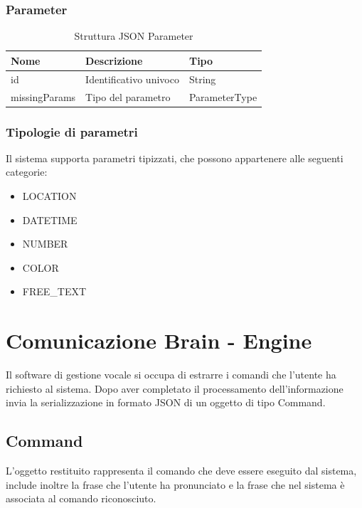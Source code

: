 \documentclass[twoside]{supsistudent}
\begin{document}
\subsection{Parameter}
\begin{table}[H]
\centering
\caption{Struttura JSON Parameter}
\label{Struttura JSON Parameter}
\begin{tabular}{@{}|l|l|l|@{}}
\toprule
Nome & Descrizione            & Tipo          \\ \midrule
id   & Identificativo univoco & String        \\ \midrule
missingParams & Tipo del parametro     & ParameterType \\ \bottomrule
\end{tabular}
\end{table}

\subsection{Tipologie di parametri}
Il sistema supporta parametri tipizzati, che possono appartenere alle seguenti categorie:
\begin{itemize}
	\item LOCATION
	\item DATETIME
	\item NUMBER
	\item COLOR
	\item FREE\_TEXT
\end{itemize}

\chapter{Comunicazione Brain - Engine }
Il software di gestione vocale si occupa di estrarre i comandi che l'utente ha richiesto al sistema. Dopo aver completato il processamento dell'informazione invia la serializzazione in formato JSON di un oggetto di tipo Command.
\section{Command}
L'oggetto restituito rappresenta il comando che deve essere eseguito dal sistema, include inoltre la frase che l'utente ha pronunciato e la frase che nel sistema è associata al comando riconosciuto.
\end{document}
